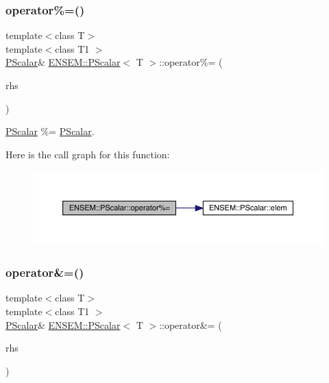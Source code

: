 \subsubsection{\texorpdfstring{operator\%=()}{operator\%=()}\hspace{0.1cm}{\footnotesize\ttfamily [3/3]}}
{\footnotesize\ttfamily template$<$class T$>$ \\
template$<$class T1 $>$ \\
\mbox{\hyperlink{classENSEM_1_1PScalar}{P\+Scalar}}\& \mbox{\hyperlink{classENSEM_1_1PScalar}{E\+N\+S\+E\+M\+::\+P\+Scalar}}$<$ T $>$\+::operator\%= (\begin{DoxyParamCaption}\item[{const \mbox{\hyperlink{classENSEM_1_1PScalar}{P\+Scalar}}$<$ T1 $>$ \&}]{rhs }\end{DoxyParamCaption})\hspace{0.3cm}{\ttfamily [inline]}}



\mbox{\hyperlink{classENSEM_1_1PScalar}{P\+Scalar}} \%= \mbox{\hyperlink{classENSEM_1_1PScalar}{P\+Scalar}}. 

Here is the call graph for this function\+:
\nopagebreak
\begin{figure}[H]
\begin{center}
\leavevmode
\includegraphics[width=350pt]{d3/d27/classENSEM_1_1PScalar_ab583ff2667eba7d2bed2acbd3c15e43e_cgraph}
\end{center}
\end{figure}
\mbox{\label{classENSEM_1_1PScalar_a9c683c36c7129b6b016af09f8d5cda42}} 
\subsubsection{\texorpdfstring{operator\&=()}{operator\&=()}\hspace{0.1cm}{\footnotesize\ttfamily [1/3]}}
{\footnotesize\ttfamily template$<$class T$>$ \\
template$<$class T1 $>$ \\
\mbox{\hyperlink{classENSEM_1_1PScalar}{P\+Scalar}}\& \mbox{\hyperlink{classENSEM_1_1PScalar}{E\+N\+S\+E\+M\+::\+P\+Scalar}}$<$ T $>$\+::operator\&= (\begin{DoxyParamCaption}\item[{const \mbox{\hyperlink{classENSEM_1_1PScalar}{P\+Scalar}}$<$ T1 $>$ \&}]{rhs }\end{DoxyParamCaption})\hspace{0.3cm}{\ttfamily [inline]}}



